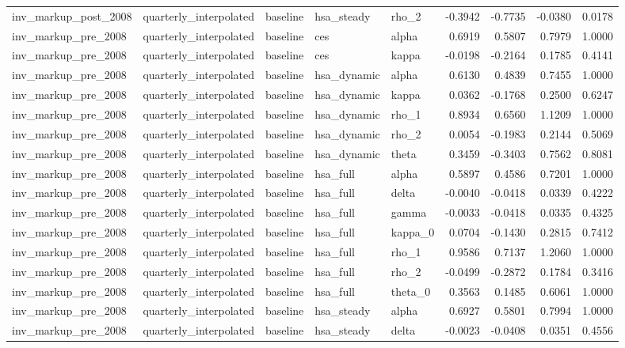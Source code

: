 \begin{tabular}{lllllrrrr}
inv\_markup\_post\_2008 & quarterly\_interpolated & baseline & hsa\_steady & rho\_2 & -0.3942 & -0.7735 & -0.0380 & 0.0178 \\
inv\_markup\_pre\_2008 & quarterly\_interpolated & baseline & ces & alpha & 0.6919 & 0.5807 & 0.7979 & 1.0000 \\
inv\_markup\_pre\_2008 & quarterly\_interpolated & baseline & ces & kappa & -0.0198 & -0.2164 & 0.1785 & 0.4141 \\
inv\_markup\_pre\_2008 & quarterly\_interpolated & baseline & hsa\_dynamic & alpha & 0.6130 & 0.4839 & 0.7455 & 1.0000 \\
inv\_markup\_pre\_2008 & quarterly\_interpolated & baseline & hsa\_dynamic & kappa & 0.0362 & -0.1768 & 0.2500 & 0.6247 \\
inv\_markup\_pre\_2008 & quarterly\_interpolated & baseline & hsa\_dynamic & rho\_1 & 0.8934 & 0.6560 & 1.1209 & 1.0000 \\
inv\_markup\_pre\_2008 & quarterly\_interpolated & baseline & hsa\_dynamic & rho\_2 & 0.0054 & -0.1983 & 0.2144 & 0.5069 \\
inv\_markup\_pre\_2008 & quarterly\_interpolated & baseline & hsa\_dynamic & theta & 0.3459 & -0.3403 & 0.7562 & 0.8081 \\
inv\_markup\_pre\_2008 & quarterly\_interpolated & baseline & hsa\_full & alpha & 0.5897 & 0.4586 & 0.7201 & 1.0000 \\
inv\_markup\_pre\_2008 & quarterly\_interpolated & baseline & hsa\_full & delta & -0.0040 & -0.0418 & 0.0339 & 0.4222 \\
inv\_markup\_pre\_2008 & quarterly\_interpolated & baseline & hsa\_full & gamma & -0.0033 & -0.0418 & 0.0335 & 0.4325 \\
inv\_markup\_pre\_2008 & quarterly\_interpolated & baseline & hsa\_full & kappa\_0 & 0.0704 & -0.1430 & 0.2815 & 0.7412 \\
inv\_markup\_pre\_2008 & quarterly\_interpolated & baseline & hsa\_full & rho\_1 & 0.9586 & 0.7137 & 1.2060 & 1.0000 \\
inv\_markup\_pre\_2008 & quarterly\_interpolated & baseline & hsa\_full & rho\_2 & -0.0499 & -0.2872 & 0.1784 & 0.3416 \\
inv\_markup\_pre\_2008 & quarterly\_interpolated & baseline & hsa\_full & theta\_0 & 0.3563 & 0.1485 & 0.6061 & 1.0000 \\
inv\_markup\_pre\_2008 & quarterly\_interpolated & baseline & hsa\_steady & alpha & 0.6927 & 0.5801 & 0.7994 & 1.0000 \\
inv\_markup\_pre\_2008 & quarterly\_interpolated & baseline & hsa\_steady & delta & -0.0023 & -0.0408 & 0.0351 & 0.4556 \\

\end{tabular}
